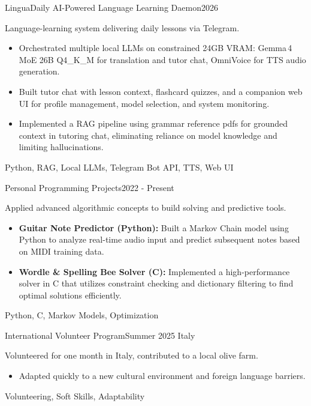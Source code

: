 \begin{projects}
	\project
	{LinguaDaily \textemdash{} AI-Powered Language Learning Daemon}{2026}
	{}
	{Language-learning system delivering daily lessons via Telegram.
	\begin{itemize}
    \item Orchestrated multiple local LLMs on constrained 24GB VRAM: Gemma\,4 MoE 26B Q4\_K\_M for translation and tutor chat, OmniVoice for TTS audio generation.
    \item Built tutor chat with lesson context, flashcard quizzes, and a companion web UI for profile management, model selection, and system monitoring.
		\item Implemented a RAG pipeline using grammar reference pdfs for grounded context in tutoring chat, eliminating reliance on model knowledge and limiting hallucinations.
	\end{itemize}
	}
	{Python, RAG, Local LLMs, Telegram Bot API, TTS, Web UI}

	\project
	{Personal Programming Projects}{2022 - Present}
	{} 
	{Applied advanced algorithmic concepts to build solving and predictive tools.
	\begin{itemize}
		\item \textbf{Guitar Note Predictor (Python):} Built a Markov Chain model using Python to analyze real-time audio input and predict subsequent notes based on MIDI training data.
    \item \textbf{Wordle \& Spelling Bee Solver (C):} Implemented a high-performance solver in C that utilizes constraint checking and dictionary filtering to find optimal solutions efficiently.
	\end{itemize}
	}
	{Python, C, Markov Models, Optimization}

	\project
	{International Volunteer Program}{Summer 2025}
	{Italy}
	{Volunteered for one month in Italy, contributed to a local olive farm.
	\begin{itemize}
		\item Adapted quickly to a new cultural environment and foreign language barriers.
	\end{itemize}
	}
	{Volunteering, Soft Skills, Adaptability}

\end{projects}
